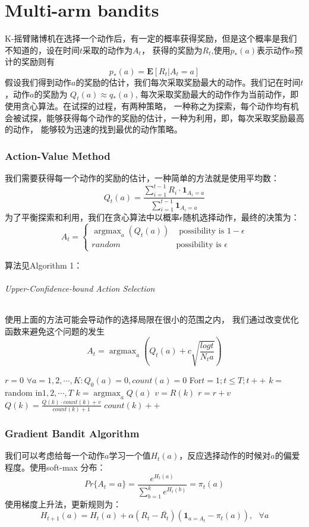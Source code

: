 \part{Multi-arm bandits}
K-摇臂赌博机在选择一个动作后，有一定的概率获得奖励，但是这个概率是我们不知道的，设在时间$t$采取的动作为$A_t$，
获得的奖励为$R_t$,使用$p_* (a)$表示动作$a$预计的奖励则有$$p_* (a)=\boldsymbol{E}[R_t|A_t =a]$$
假设我们得到动作$a$的奖励的估计，我们每次采取奖励最大的动作。我们记在时间$t$，动作$a$的奖励为
$Q_t(a) \approx q_* (a)$, 每次采取奖励最大的动作作为当前动作，即使用贪心算法。在试探的过程，有两种策略，
一种称之为探索，每个动作均有机会被试探，能够获得每个动作的奖励的估计，一种为利用，即，每次采取奖励最高的动作，
能够较为迅速的找到最优的动作策略。

\section{Action-Value Method}
我们需要获得每一个动作的奖励的估计，一种简单的方法就是使用平均数：
$$ Q_t(a)=\frac{ \sum_{i=1}^{t-1} R_i \cdot \boldsymbol{1}_{A_i=a} }{ \sum_{i=1}^{t-1}\boldsymbol{1}_{A_i=a} } $$
为了平衡探索和利用，我们在贪心算法中以概率$\epsilon$随机选择动作，最终的决策为：
\begin{equation*}
A_t=\begin{cases}%

  \mathop{\arg\max}_a (Q_t(a)) &\mbox{ possibility is }1 -  \epsilon \\
  random &\mbox{possibility is }\epsilon

\end{cases}
\end{equation*}

算法见Algorithm 1：
\paragraph{Upper-Confidence-bound Action Selection}
使用上面的方法可能会导动作的选择局限在很小的范围之内，
我们通过改变优化函数来避免这个问题的发生$$ A_t=\mathop{\arg\max}_a (Q_t(a)+c \sqrt{\frac{logt}{N_t a}})$$



\begin{algorithm}[]
    \caption{$\epsilon-greedy$}

    $r=0$\;
    $\forall a =1,2,\cdots,K:Q_0(a)=0,count(a)=0$\;
    For{$t=1;t \le T;t++$}
    {
      {
        $k=$random in$1,2,\cdots,T$\;
      }
      {
        $k=\mathop{\arg\max}_aQ(a)$\;
      }
      $v=R(k)$\;
      $r=r+v$\;
      $Q(k)=\frac{Q(k)\cdot count(k)+v}{count(k)+1}$\;
      $count(k)++$\;
    }
\end{algorithm}
\section{Gradient Bandit Algorithm}
我们可以考虑给每一个动作$a$学习一个值$H_t (a)$，反应选择动作的时候对$a$的偏爱程度。使用soft-max
分布：$$
Pr\{A_t =a\}=\frac{e^{H_t (a)}}{\sum_{b=1}^{k} e^{H_t(b)}}=\pi_t(a)
$$
使用梯度上升法，更新规则为：
$$
H_{t+1}(a)=H_t(a)+\alpha (R_t-\bar{R_t})(\boldsymbol{1}_{a=A_t}-\pi_t(a)),\ \ \ \forall a
$$
